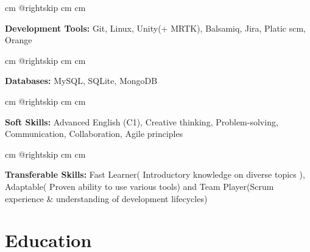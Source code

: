 \documentclass[10pt, letterpaper]{article}
\begin{document}
        \vspace{0.2 cm}
        
        \begingroup{} cm
        \advance\csname @rightskip cm
        \advance{} cm

        \textbf{Development Tools: } Git, Linux, Unity(+ MRTK), Balsamiq, Jira, Platic scm, Orange
        \par\endgroup
                
        \vspace{0.2 cm}
        
        
        \begingroup{} cm
        \advance\csname @rightskip cm
        \advance{} cm

        \textbf{Databases: } MySQL, SQLite, MongoDB\par\endgroup
                
        \vspace{0.2 cm}
        
        \begingroup{} cm
        \advance\csname @rightskip cm
        \advance{} cm

        \textbf{Soft Skills: }Advanced English (C1), Creative thinking, Problem-solving, Communication, Collaboration, Agile principles\par\endgroup
        
        \vspace{0.2 cm}
        
        \begingroup{} cm
        \advance\csname @rightskip cm
        \advance{} cm

        \textbf{Transferable Skills: }Fast Learner( Introductory knowledge on diverse topics ), Adaptable( Proven ability to use various tools) and Team Player(Scrum experience \& understanding of development lifecycles)\par\endgroup        
    \section{Education}
\end{document}
